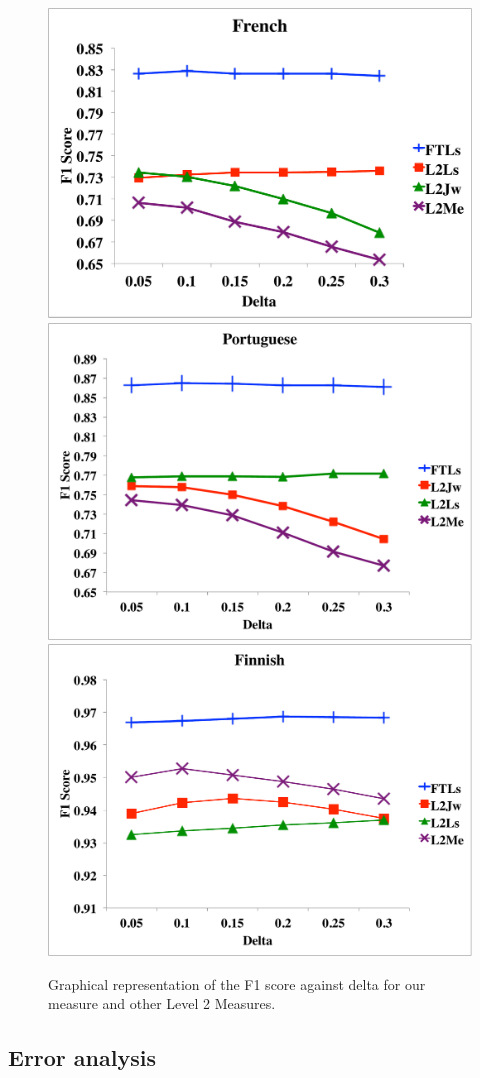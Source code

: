 \documentclass[10pt, a4paper]{article}
\begin{document}
\begin{figure}
\centering
\includegraphics[width=.65\columnwidth]{french}
\includegraphics[width=.65\columnwidth]{portuguese}
\includegraphics[width=.65\columnwidth]{finnish}
\caption{Graphical representation of the F1 score against delta for our measure and other Level 2 Measures.}
\label{fig.2}
\end{figure}

\subsection{Error analysis}
\end{document}
